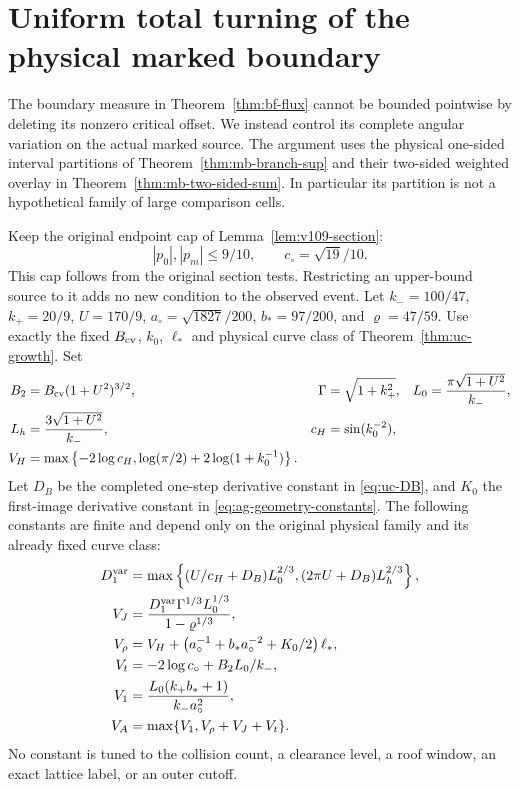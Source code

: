 \section{Uniform total turning of the physical marked boundary}
\label{sec:ab-turning}

The boundary measure in Theorem~\ref{thm:bf-flux} cannot be bounded
pointwise by deleting its nonzero critical offset.  We instead control
its complete angular variation on the actual marked source.  The
argument uses the physical one-sided interval partitions of
Theorem~\ref{thm:mb-branch-sup} and their two-sided weighted overlay
in Theorem~\ref{thm:mb-two-sided-sum}.  In particular its partition
is not a hypothetical family of large comparison cells.

Keep the original endpoint cap of Lemma~\ref{lem:v109-section}:
\[
 |p_0|,|p_m|\le 9/10,\qquad c_\circ=\sqrt{19}/10.
\]
This cap follows from the original section tests.  Restricting an
upper-bound source to it adds no new condition to the observed event.
Let $k_-=100/47$, $k_+=20/9$, $U=170/9$,
$a_\circ=\sqrt{1827}/200$, $b_*=97/200$, and
$\varrho=47/59$.  Use exactly the fixed $B_{\rm cv}$, $k_0$,
$\ell_*$ and physical curve class of
Theorem~\ref{thm:uc-growth}.  Set
\begin{align}
 B_2&=B_{\rm cv}(1+U^2)^{3/2},&
 \Gamma&=\sqrt{1+k_+^2},&
 L_0&=\frac{\pi\sqrt{1+U^2}}{k_-},\notag\\
 L_h&=\frac{3\sqrt{1+U^2}}{k_-},&
 c_H&=\sin(k_0^{-2}),\notag\\
 V_H&=\max\left\{-2\log c_H,
            \log(\pi/2)+2\log(1+k_0^{-1})\right\}.
                                                        \label{eq:ab-constants-one}
\end{align}
Let $D_B$ be the completed one-step derivative constant in
\eqref{eq:uc-DB}, and $K_0$ the first-image derivative constant in
\eqref{eq:ag-geometry-constants}.  The following constants are finite
and depend only on the original physical family and its already fixed
curve class:
\begin{align}
 D_1^{\rm var}
  &=\max\left\{
       (U/c_H+D_B)L_0^{2/3},
       (2\pi U+D_B)L_h^{2/3}\right\},\notag\\
 V_J&=\frac{D_1^{\rm var}\Gamma^{1/3}L_0^{1/3}}
                     {1-\varrho^{1/3}},\notag\\
 V_\rho&=V_H+
       \left(a_\circ^{-1}+b_*a_\circ^{-2}+K_0/2\right)\ell_*,
                                                        \label{eq:ab-constants-two}\\
 V_t&=-2\log c_\circ+B_2L_0/k_-,\notag\\
 V_1&=\frac{L_0(k_+b_*+1)}{k_-a_\circ^2},\notag\\
 V_A&=\max\{V_1,V_\rho+V_J+V_t\}.
                                                        \label{eq:ab-constants-three}
\end{align}
No constant is tuned to the collision count, a clearance level, a
roof window, an exact lattice label, or an outer cutoff.

